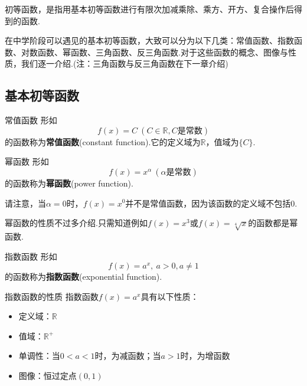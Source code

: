 \documentclass[lang=cn, zihao=5]{elegantbook}
\begin{document}
初等函数，是指用基本初等函数进行有限次加减乘除、乘方、开方、复合操作后得到的函数.

在中学阶段可以遇见的基本初等函数，大致可以分为以下几类：常值函数、指数函数、对数函数、幂函数、三角函数、反三角函数.对于这些函数的概念、图像与性质，我们逐一介绍.(注：三角函数与反三角函数在下一章介绍)

\subsection{基本初等函数}

\begin{definition}{常值函数}
    形如$$f(x)=C \ (C \in \mathbb{R}, C\textit{是常数})$$
    的函数称为\textbf{常值函数}(constant function).它的定义域为$\mathbb{R}$，值域为$\{ C \}$.
\end{definition}

\begin{definition}{幂函数}
    形如$$f(x)=x^{\alpha} \ (\alpha \text{是常数})$$
    的函数称为\textbf{幂函数}(power function).
\end{definition}
\begin{remark}
	请注意，当$\alpha =0$时，$f(x)=x^0$并不是常值函数，因为该函数的定义域不包括$0$.
\end{remark}

幂函数的性质不过多介绍.只需知道例如$f(x)=x^3$或$f(x)=\sqrt[4]{x}$的函数都是幂函数.

\begin{definition}{指数函数}
    形如$$f(x)=a^x, \ a>0 , a\neq 1$$
    的函数称为\textbf{指数函数}(exponential function).
\end{definition}

\begin{proposition}{指数函数的性质}
    指数函数$f(x)=a^x$具有以下性质：
    \begin{itemize}
        \item 定义域：$\mathbb{R}$
        \item 值域：$\mathbb{R}^+$
        \item 单调性：当$0<a<1$时，为减函数；当$a>1$时，为增函数
        \item 图像：恒过定点$(0,1)$
    \end{itemize}
\end{proposition}
\end{document}
